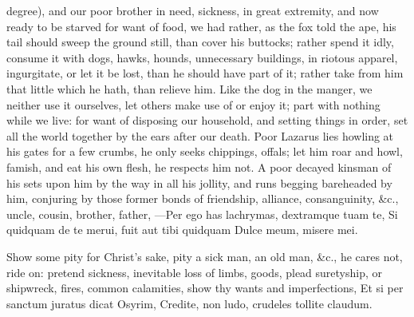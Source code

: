 {degree), and our poor brother in need, sickness, in great extremity,
and now ready to be starved for want of food, we had rather, as the fox
told the ape, his tail should sweep the ground still, than cover his
buttocks; rather spend it idly, consume it with dogs, hawks, hounds,
unnecessary buildings, in riotous apparel, ingurgitate, or let it be
lost, than he should have part of it; rather take from him that
little which he hath, than relieve him.
Like the dog in the manger, we neither use it ourselves, let others
make use of or enjoy it; part with nothing while we live: for want of
disposing our household, and setting things in order, set all the world
together by the ears after our death. Poor Lazarus lies howling at his
gates for a few crumbs, he only seeks chippings, offals; let him roar
and howl, famish, and eat his own flesh, he respects him not. A poor
decayed kinsman of his sets upon him by the way in all his jollity, and
runs begging bareheaded by him, conjuring by those former bonds of
friendship, alliance, consanguinity, \&c., uncle, cousin, brother,
father,
---Per ego has lachrymas, dextramque tuam te,
Si quidquam de te merui, fuit aut tibi quidquam
Dulce meum, misere mei.

Show some pity for Christ's sake, pity a sick man, an old man, \&c., he
cares not, ride on: pretend sickness, inevitable loss of limbs, goods,
plead suretyship, or shipwreck, fires, common calamities, show thy
wants and imperfections,
Et si per sanctum juratus dicat Osyrim,
Credite, non ludo, crudeles tollite claudum.

}
